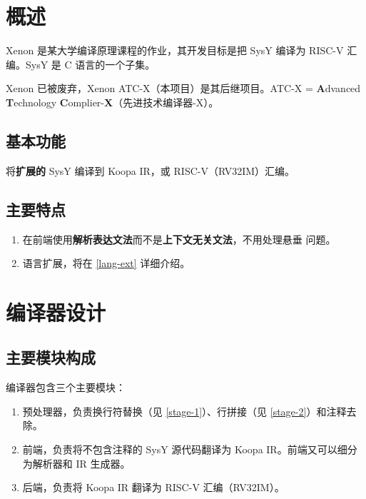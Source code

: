 %
%
%
%

\section{概述}
Xenon 是某大学编译原理课程的作业，其开发目标是把 SysY 编译为 RISC-V 汇编。SysY 是 C 语言的一个子集。

Xenon 已被废弃，Xenon ATC-X（本项目）是其后继项目。ATC-X = \textbf{A}dvanced \textbf{T}echnology \textbf{C}omplier-\textbf{X}（先进技术编译器-X）。
\subsection{基本功能}
将\textbf{扩展的} SysY 编译到 Koopa IR，或 RISC-V（RV32IM）汇编。
\subsection{主要特点}
\begin{enumerate}
    \item 在前端使用\textbf{解析表达文法}而不是\textbf{上下文无关文法}，不用处理悬垂  问题。
    \item 语言扩展，将在 \ref{lang-ext} 详细介绍。
\end{enumerate}
\section{编译器设计}
\subsection{主要模块构成}
编译器包含三个主要模块：
\begin{enumerate}
    \item 预处理器，负责换行符替换（见 \ref{stage-1}）、行拼接（见 \ref{stage-2}）和注释去除。
    \item 前端，负责将不包含注释的 SysY 源代码翻译为 Koopa IR。前端又可以细分为解析器和 IR 生成器。
    \item 后端，负责将 Koopa IR 翻译为 RISC-V 汇编（RV32IM）。
\end{enumerate}
